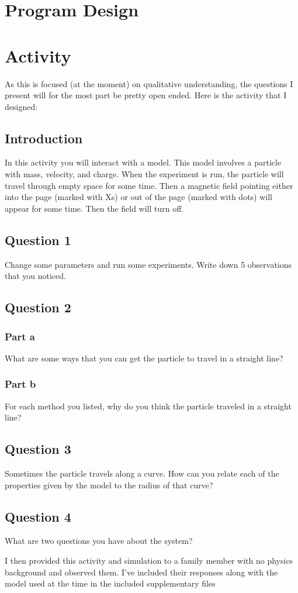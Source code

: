 \documentclass[11pt]{article}
\begin{document}
   	    \section*{Program Design}
   	    
   	    \section*{Activity}
   	    
   	    As this is focused (at the moment) on qualitative understanding, the questions I present will for the most part be pretty open ended. Here is the activity that I designed:
   	    
   	    \subsection*{Introduction}
   	    
   	    	In this activity you will interact with a model. This model involves a particle with mass, velocity, and charge. When the experiment is run, the particle will travel through empty space for some time. Then a magnetic field pointing either into the page (marked with Xs) or out of the page (marked with dots) will appear for some time. Then the field will turn off.
   	    
   	    \subsection*{Question 1}
			Change some parameters and run some experiments. Write down 5 observations that you noticed.
			
		\subsection*{Question 2}
			\subsubsection*{Part a}
				What are some ways that you can get the particle to travel in a straight line?
				
			\subsubsection*{Part b}
				For each method you listed, why do you think the particle traveled in a straight line?
			
		\subsection*{Question 3}
			Sometimes the particle travels along a curve. How can you relate each of the properties given by the model to the radius of that curve?
			
		\subsection*{Question 4}
			What are two questions you have about the system?
			
		I then provided this activity and simulation to a family member with no physics background and observed them. I've included their responses along with the model used at the time in the included supplementary files
\end{document}
